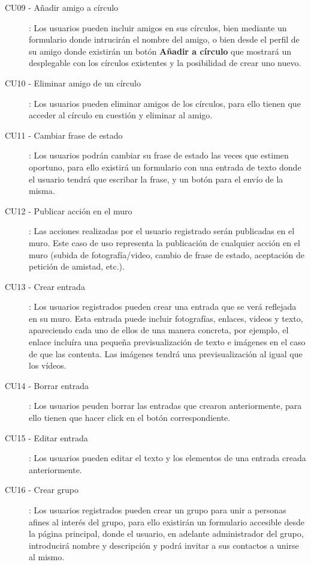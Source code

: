 \documentclass[12pt, a4paper, titlepage]{article}
\begin{document}
\begin{description}
	\item [CU09 - Añadir amigo a círculo]: Los usuarios pueden incluir amigos en sus círculos, bien mediante un formulario donde intrucirán el nombre del amigo, o bien desde el perfil de su amigo donde existirán un botón \textbf{Añadir a círculo} que mostrará un desplegable con los círculos existentes y la posibilidad de crear uno nuevo.
	
	\item [CU10 - Eliminar amigo de un círculo]: Los usuarios pueden eliminar amigos de los círculos, para ello tienen que acceder al círculo en cuestión y eliminar al amigo.
	
	\item [CU11 - Cambiar frase de estado]: Los usuarios podrán cambiar su frase de estado las veces que estimen oportuno, para ello existirá un formulario con una entrada de texto donde el usuario tendrá que escribar la frase, y un botón para el envío de la misma.
	
	\item [CU12 - Publicar acción en el muro]: Las acciones realizadas por el usuario registrado serán publicadas en el muro. Este caso de uso representa la publicación de cualquier acción en el muro (subida de fotografía/video, cambio de frase de estado, aceptación de petición de amistad, etc.).
	
	\item [CU13 - Crear entrada]: Los usuarios registrados pueden crear una entrada que se verá reflejada en su muro. Esta entrada puede incluir fotografías, enlaces, videos y texto, apareciendo cada uno de ellos de una manera concreta, por ejemplo, el enlace incluíra una pequeña previsualización de texto e imágenes en el caso de que las contenta. Las imágenes tendrá una previsualización al igual que los vídeos.
	
	\item [CU14 - Borrar entrada]: Los usuarios peuden borrar las entradas que crearon anteriormente, para ello tienen que hacer click en el botón correspondiente.
	
	\item [CU15 - Editar entrada]: Los usuarios pueden editar el texto y los elementos de una entrada creada anteriormente.
	
	\item [CU16 - Crear grupo]: Los usuarios registrados pueden crear un grupo para unir a personas afines al interés del grupo, para ello existirán un formulario accesible desde la página principal, donde el usuario, en adelante administrador del grupo, introducirá nombre y descripción y podrá invitar a sus contactos a unirse al mismo.
	

\end{description}
\end{document}
